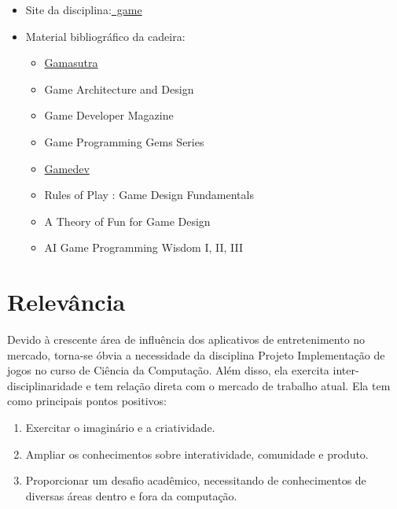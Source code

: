\documentclass[a4paper]{article}
\begin{document}
\begin{itemize}
	\item \cite{CinGame}Site da disciplina:\href{http://www.cin.ufpe.br/~game/}{~game}
	\item Material bibliográfico da cadeira:
    
	\begin{itemize}
    
		\item \cite{gamasutra} \href{http://www.gamasutra.com/}{Gamasutra}
        \item \cite{gameArchitecture} Game Architecture and Design
        \item \cite{gameDevMagazine} Game Developer Magazine
        \item \cite{gameproggemsSeries} Game Programming Gems Series
        \item \cite{gamedevSite} \href{https://www.gamedev.net/}{Gamedev}
        \item \cite{Rulesplay} Rules of Play : Game Design Fundamentals
        \item \cite{FunGameDesign} A Theory of Fun for Game Design
        \item \cite{AIWisdom} AI Game Programming Wisdom I, II, III
        
        
	\end{itemize}
    
\end{itemize}

\section{Relevância}

Devido à crescente área de influência dos aplicativos de entretenimento no mercado, torna-se óbvia a necessidade da disciplina Projeto Implementação de jogos no curso de Ciência da Computação. Além disso, ela exercita inter-disciplinaridade e tem relação direta com o mercado de trabalho atual. Ela tem como principais pontos positivos:

\begin{enumerate}
	\item Exercitar o imaginário e a criatividade.
	\item Ampliar os conhecimentos sobre interatividade, comunidade e produto.
	\item Proporcionar um desafio acadêmico, necessitando de conhecimentos de diversas áreas dentro e fora da computação.
\end{enumerate}
\end{document}
